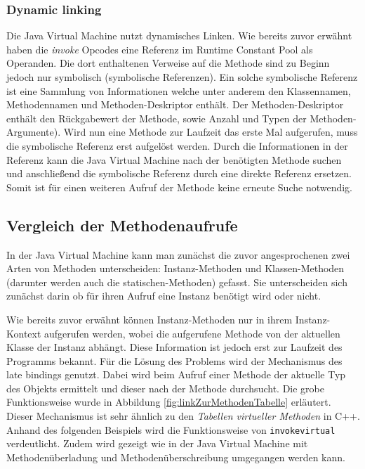 \documentclass[conference]{IEEEtran}
\begin{document}
\subsubsection{Dynamic linking}
Die Java Virtual Machine nutzt dynamisches Linken. Wie bereits zuvor erwähnt haben die \textit{invoke} Opcodes eine Referenz im Runtime Constant Pool als Operanden. Die dort enthaltenen Verweise auf die Methode sind zu Beginn jedoch nur symbolisch (symbolische Referenzen). Ein solche symbolische Referenz ist eine Sammlung von Informationen welche unter anderem den Klassennamen, Methodennamen und Methoden-Deskriptor enthält. Der Methoden-Deskriptor enthält den Rückgabewert der Methode, sowie Anzahl und Typen der Methoden-Argumente). Wird nun eine Methode zur Laufzeit das erste Mal aufgerufen, muss die symbolische Referenz erst aufgelöst werden. Durch die Informationen in der Referenz kann die Java Virtual Machine nach der benötigten Methode suchen und anschließend die symbolische Referenz durch eine direkte Referenz ersetzen. Somit ist für einen weiteren Aufruf der Methode keine erneute Suche notwendig.\cite{Venners.1997}


\subsection{Vergleich der Methodenaufrufe}
In der Java Virtual Machine kann man zunächst die zuvor angesprochenen zwei Arten von Methoden unterscheiden: Instanz-Methoden und Klassen-Methoden (darunter werden auch die statischen-Methoden) gefasst. Sie unterscheiden sich zunächst darin ob für ihren Aufruf eine Instanz benötigt wird oder nicht. 

Wie bereits zuvor erwähnt können Instanz-Methoden nur in ihrem Instanz-Kontext aufgerufen werden, wobei die aufgerufene Methode von der aktuellen Klasse der Instanz abhängt. Diese Information ist jedoch erst zur Laufzeit des Programms bekannt. Für die Lösung des Problems wird der Mechanismus des late bindings genutzt. Dabei wird beim Aufruf einer Methode der aktuelle Typ des Objekts ermittelt und dieser nach der Methode durchsucht. Die grobe Funktionsweise wurde in Abbildung \ref{fig:linkZurMethodenTabelle} erläutert. Dieser Mechanismus ist sehr ähnlich zu den \textit{Tabellen virtueller Methoden} in C++. Anhand des folgenden Beispiels wird die Funktionsweise von \verb|invokevirtual| verdeutlicht. Zudem wird gezeigt wie in der Java Virtual Machine mit Methodenüberladung und Methodenüberschreibung umgegangen werden kann.

\end{document}

